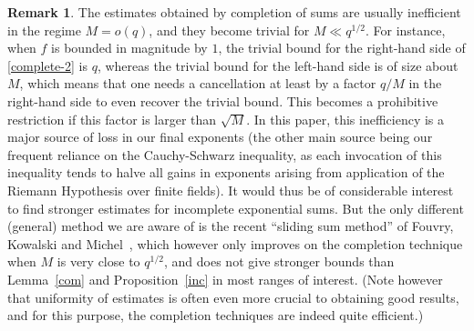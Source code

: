 \documentclass[12pt,a4paper,reqno]{amsart}
\numberwithin{equation}{section}
\theoremstyle{plain}
\theoremstyle{definition}
\newtheorem{remark}[theorem]{Remark}
\begin{document}
\begin{remark} The estimates obtained by completion of sums are
  usually inefficient in the regime $M = o(q)$, and they become
  trivial for $M\ll q^{1/2}$. For instance, when $f$ is
  bounded in magnitude by $1$, the trivial bound for the right-hand
  side of \eqref{complete-2} is $q$, whereas the trivial bound for the
  left-hand side is of size about $M$, which means that one needs a
  cancellation at least by a factor $q/M$ in the right-hand side to
  even recover the trivial bound. This becomes a prohibitive
  restriction if this factor is larger than $\sqrt{M}$.  In this
  paper, this inefficiency is a major source of loss in our final
  exponents (the other main source being our frequent reliance on the
  Cauchy-Schwarz inequality, as each invocation of this inequality
  tends to halve all gains in exponents arising from application of
  the Riemann Hypothesis over finite fields). It would thus be of
  considerable interest to find stronger estimates for incomplete
  exponential sums. But the only different (general) method we are
  aware of is the recent ``sliding sum method'' of Fouvry, Kowalski
  and Michel~\cite{sliding}, which however only improves on the
  completion technique when $M$ is very close to $q^{1/2}$, and does
  not give stronger bounds than Lemma~\ref{com} and Proposition~\ref{inc} in most
  ranges of interest. (Note however that uniformity of estimates is
  often even more crucial to obtaining good results, and for this
  purpose, the completion techniques are indeed quite efficient.)
\end{remark}
\end{document}
